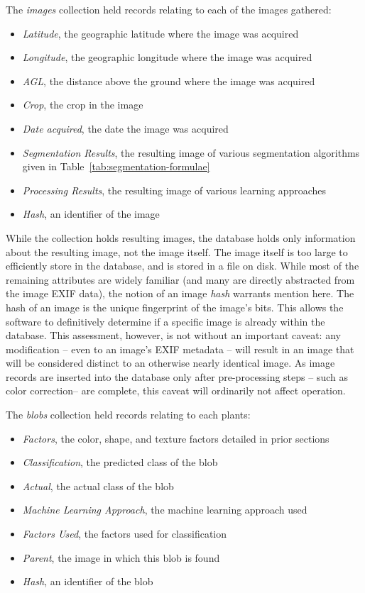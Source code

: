 \documentclass[letterpaper]{article}
\begin{document}
{The \textit{images} collection held records relating to each of the images gathered:
\begin{itemize}
	\item{\textit{Latitude}, the geographic latitude where the image was acquired}
	\item{\textit{Longitude}, the geographic longitude where the image was acquired}
	\item{\textit{AGL}, the distance above the ground where the image was acquired}
	\item{\textit{Crop}, the crop in the image}
	\item{\textit{Date acquired}, the date the image was acquired}
	\item{\textit{Segmentation Results}, the resulting image of various segmentation algorithms given in Table~\ref{tab:segmentation-formulae}}	
	\item{\textit{Processing Results}, the resulting image of various learning approaches}	
	\item{\textit{Hash}, an identifier of the image}	
\end{itemize}
 While the collection holds resulting images, the database holds only information about the resulting image, not the image itself. The image itself is too large to efficiently store in the database, and is stored in a file on disk. While most of the remaining attributes are widely familiar (and many are directly abstracted from the image EXIF data), the notion of an image \textit{hash} warrants mention here. The hash of an image is the unique fingerprint of the image's bits. This allows the software to definitively determine if a specific image is already within the database. This assessment, however, is not without an important caveat: any modification -- even to an image's EXIF metadata -- will result in an image that will be considered distinct to an otherwise nearly identical image. As image records are inserted into the database only after pre-processing steps -- such as color correction-- are complete, this caveat will ordinarily not affect operation.
 
 The \textit{blobs} collection held records relating to each plants:
 \begin{itemize}
 	\item{\textit{Factors}, the color, shape, and texture factors detailed in prior sections}	
	\item{\textit{Classification}, the predicted class of the blob}	
	\item{\textit{Actual}, the actual class of the blob}	
	\item{\textit{Machine Learning Approach}, the machine learning approach used}	
	\item{\textit{Factors Used}, the factors used for classification}	
	\item{\textit{Parent}, the image in which this blob is found}
	\item{\textit{Hash}, an identifier of the blob}	
 \end{itemize}

}
\end{document}
